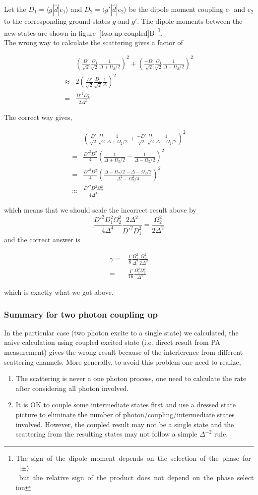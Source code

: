 \documentclass[10pt,fleqn]{article}
\newcommand{\eqar}[1]
{
  \begin{align*}
    #1
  \end{align*}
}
\newcommand{\paren}[1]{{\left({#1}\right)}}
\begin{document}
Let the $D_1=\langle g|\hat d|e_1\rangle$ and $D_2=\langle g'|\hat d|e_2\rangle$ be
the dipole moment coupling $e_1$ and $e_2$ to the corresponding ground states $g$ and $g'$.
The dipole moments between the new states are shown in \mbox{figure \ref{two-up-coupled}B
  \footnote{The sign of the dipole moment depends on the selection of the phase for
    $|\pm\rangle$ but the relative sign of the product does not depend on the phase selection}.}\\

The wrong way to calculate the scattering gives a factor of
\eqar{
  &\paren{\frac{D'}{\sqrt2}\frac{D_1}{\sqrt2}\frac{1}{\Delta+\Omega_2/2}}^2+\paren{\frac{-D'}{\sqrt2}\frac{D_1}{\sqrt2}\frac{1}{\Delta-\Omega_2/2}}^2\\
  \approx&2\paren{\frac{D'}{\sqrt2}\frac{D_1}{\sqrt2}\frac{1}{\Delta}}^2\\
  =&\frac{D'^2D_1^2}{2\Delta^2}
}
The correct way gives,
\eqar{
  &\paren{\frac{D'}{\sqrt2}\frac{D_1}{\sqrt2}\frac{1}{\Delta+\Omega_2/2}+\frac{-D'}{\sqrt2}\frac{D_1}{\sqrt2}\frac{1}{\Delta-\Omega_2/2}}^2\\
  =&\frac{D'^2D_1^2}{4}\paren{\frac{1}{\Delta+\Omega_2/2}-\frac{1}{\Delta-\Omega_2/2}}^2\\
  =&\frac{D'^2D_1^2}{4}\paren{\frac{\Delta-\Omega_2/2-\Delta-\Omega_2/2}{\Delta^2-\Omega_2^2/4}}^2\\
  \approx&\frac{D'^2D_1^2\Omega_2^2}{4\Delta^4}
}
which means that we should scale the incorrect result above by
\[\frac{D'^2D_1^2\Omega_2^2}{4\Delta^4}\frac{2\Delta^2}{D'^2D_1^2}=\frac{\Omega_2^2}{2\Delta^2}\]
and the correct answer is
\eqar{
  \gamma=&\frac{\Gamma}{8}\frac{\Omega_1^2}{\Delta^2}\frac{\Omega_2^2}{2\Delta^2}\\
  =&\frac{\Gamma}{16}\frac{\Omega_1^2\Omega_2^2}{\Delta^4}
}
which is exactly what we got above.

\subsubsection{Summary for two photon coupling up}

In the particular case (two photon excite to a single state) we calculated,
the naive calculation using coupled excited state (i.e. direct result from PA measurement)
gives the wrong result because of the interference from different scattering channels.
More generally, to avoid this problem one need to realize,
\begin{enumerate}
\item The scattering is never a one photon process, one need to calculate the rate
  after considering all photon involved.
\item It is OK to couple some intermediate states first and use a dressed state picture
  to eliminate the number of photon/coupling/intermediate states involved. However,
  the coupled result may not be a single state and the scattering from the resulting
  states may not follow a simple $\Delta^{-2}$ rule.
\end{enumerate}
\end{document}

